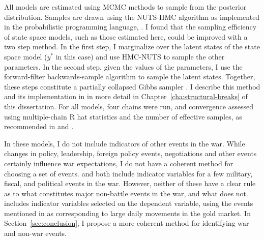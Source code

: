All models are estimated using MCMC methods to sample from the posterior distribution.
Samples are drawn using the NUTS-HMC algorithm \parencite{HoffmanGelman2014a} as implemented in the probabilistic programming language, \Stan{} \parencites{Stan2015a}.
I found that the sampling efficiency of state space models, such as those estimated here, could be improved with a two step method.
In the first step, I marginalize over the latent states of the state space model ($y^{*}$ in this case) and use HMC-NUTS to sample the other parameters.
In the second step, given the values of the parameters, I use the forward-filter backwards-sample algorithm \parencites{Fruehwirth-Schnatter1994}{CarterKohn1994} to sample the latent states.
Together, these steps constitute a partially collapsed Gibbs sampler \parencite{VanDykPark2008a}.
I describe this method and its implementation in \Stan{} in more detail in Chapter~\ref{cha:structural-breaks} of this dissertation.
For all models, four chains were run, and convergence assessed using multiple-chain R hat statistics and the number of effective samples, as recommended in \parencites{Stan2015a} and \textcite{GelmanCarlinSternEtAl2013a}.

In these models, I do not include indicators of other events in the war.
While changes in policy, leadership, foreign policy events, negotiations and other events certainly influence war expectations, I do not have a coherent method for choosing a set of events.
\textcite{McCandless1996} and \textcite{SmithSmith1997} both include indicator variables for a few military, fiscal, and political events in the war.
However, neither of these have a clear rule as to what constitutes major non-battle events in the war, and what does not.
\textcite{SmithSmith1997} includes indicator variables selected on the dependent variable, using the events mentioned in \textcite{Mitchell1903} as corresponding to large daily movements in the gold market.
In Section~\ref{sec:conclusion}, I propose a more coherent method for identifying war and non-war events.

